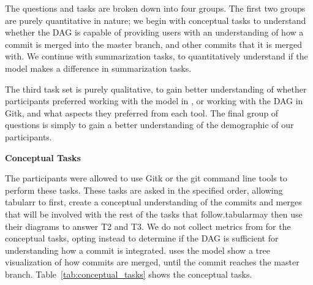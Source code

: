 \documentclass[draft]{IEEEtran}
\begin{document}


The questions and tasks are broken down into four groups. The first two
groups are purely quantitative in nature; we begin with conceptual tasks
to understand whether the DAG is capable of providing users with an
understanding of how a commit is merged into the master branch, and
other commits that it is merged with. We continue with summarization
tasks, to quantitatively understand if the \mt model makes a difference
in summarization tasks.

The third task set is purely qualitative,  to gain better understanding
of whether participants preferred working with the \mt model in \tool,
or working with the DAG in Gitk, and what aspects they preferred from
each tool. The final group of questions is simply to gain a better
understanding of the demographic of our participants.


\textbf{Conceptual Tasks}



The participants were allowed to use Gitk or the git command line tools
to perform these tasks. These tasks are asked in the specified order,
allowing tabularr to first, create a conceptual understanding of the
commits and merges that will be involved with the rest of the tasks that
follow.tabularmay then use their diagrams to answer T2 and T3. We do not
collect metrics from \tool for the conceptual tasks, opting instead to
determine if the DAG is sufficient for understanding how a commit is
integrated. \tool uses the \mt model show a tree visualization of how
commits are merged, until the commit reaches the master branch.
Table~\ref{tab:conceptual_tasks} shows the conceptual tasks.
\end{document}
